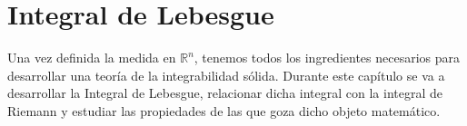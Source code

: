 \chapter{Integral de Lebesgue}
Una vez definida la medida en $\mathbb{R}^n$, tenemos todos los ingredientes necesarios para desarrollar una teoría de la integrabilidad sólida. Durante este capítulo se va a desarrollar la Integral de Lebesgue, relacionar dicha integral con la integral de Riemann y estudiar las propiedades de las que goza dicho objeto matemático.



